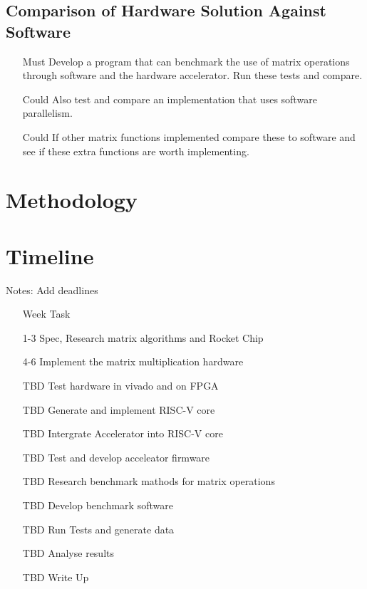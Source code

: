 \documentclass[a4paper,fleqn,12pt]{article}
\begin{document}
	\subsection{Comparison of Hardware Solution Against Software}
	\begin{enumerate}
		\item [Must] Develop a program that can benchmark the use of matrix operations through software and the hardware accelerator. Run these tests and compare.
		\item [Could] Also test and compare an implementation that uses software parallelism.
		\item [Could] If other matrix functions implemented compare these to software and see if these extra functions are worth implementing.
	\end{enumerate}
	
	\section{Methodology}
	
	\section{Timeline}
	Notes: Add deadlines
	\begin{enumerate}
		\item [Week] Task
		\item [1-3]  Spec, Research matrix algorithms and Rocket Chip
		\item [4-6]  Implement the matrix multiplication hardware
		\item [TBD]  Test hardware in vivado and on FPGA
		\item [TBD]  Generate and implement RISC-V core
		\item [TBD]  Intergrate Accelerator into RISC-V core
		\item [TBD]  Test and develop acceleator firmware
		\item [TBD]  Research benchmark mathods for matrix operations
		\item [TBD]  Develop benchmark software
		\item [TBD]  Run Tests and generate data
		\item [TBD]  Analyse results
		\item [TBD]  Write Up
	\end{enumerate}
	
\end{document}
